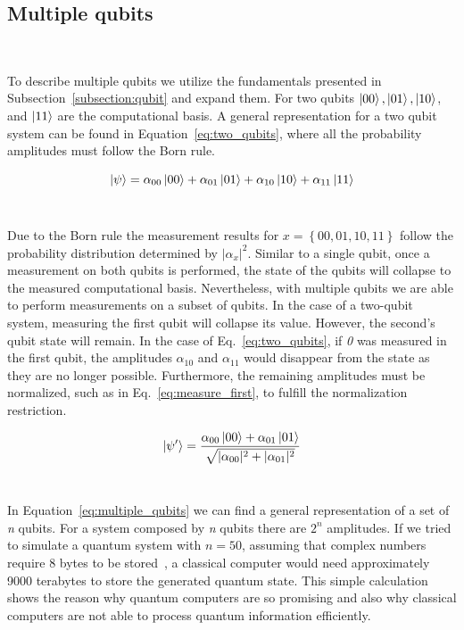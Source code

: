 \subsection{Multiple qubits} \

To describe multiple qubits we utilize the fundamentals presented in
Subsection~\ref{subsection:qubit} and expand them. For two qubits
\(\ket{00}, \ket{01}, \ket{10}\), and \(\ket{11}\) are the computational basis.
A general representation for a two qubit system can be found in 
Equation~\ref{eq:two_qubits}, where all the probability amplitudes must
follow the Born rule. \ 

\begin{equation}\label{eq:two_qubits}
  \ket{\psi} = \alpha_{00}\ket{00} + \alpha_{01}\ket{01} + \alpha_{10}\ket{10} + \alpha_{11}\ket{11}
\end{equation} \

Due to the Born rule the measurement results for
\(x = \left\{00, 01, 10, 11\right\}\) follow the probability
distribution determined by \(|\alpha_{x}|^2\). Similar to a
single qubit, once a measurement on both qubits is performed,
the state of the qubits will collapse to the measured computational
basis. Nevertheless, with multiple qubits we are able to perform
measurements on a subset of qubits. In the case of a two-qubit
system, measuring the first qubit will collapse its value. However,
the second's qubit state will remain. In the case of Eq.~\ref{eq:two_qubits},
if \textit{0} was measured in the first qubit, the amplitudes \(\alpha_{10}\)
and \(\alpha_{11}\) would disappear from the state as they are no longer
possible. Furthermore, the remaining amplitudes must be normalized,
such as in Eq.~\ref{eq:measure_first}, to fulfill the normalization
restriction.  \

\begin{equation}\label{eq:measure_first}
  \ket{\psi'} = \frac{\alpha_{00}\ket{00} + \alpha_{01}\ket{01}}
                    {\sqrt{|\alpha_{00}|^2 + |\alpha_{01}|^2}}
\end{equation} \

In Equation~\ref*{eq:multiple_qubits} we can find a general representation of
a set of \textit{n} qubits. For a system composed by \textit{n} qubits there are \(2^n\)
amplitudes. If we tried to simulate a quantum system with \(n = 50\), assuming
that complex numbers require 8 bytes to be stored~\cite{numpy}, a classical computer would need
approximately 9000 terabytes to store the generated quantum state. This simple calculation
shows the reason why quantum computers are so promising and also why classical computers
are not able to process quantum information efficiently. \

